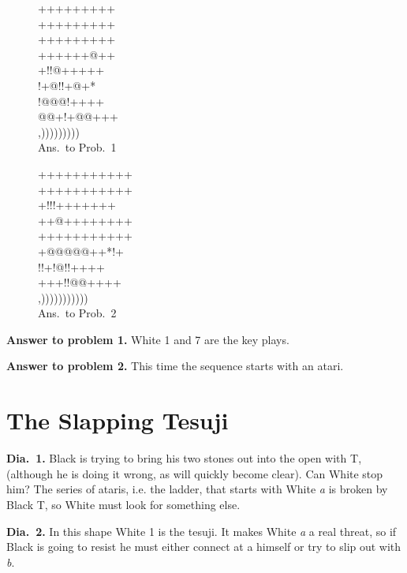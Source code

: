 \documentclass[mcrownvopaper,10pt,twopage,onecolumn,draft,showtrims]{memoir}
\begin{document}
\begin{figure}[ht]
    \begin{minipage}[c]{0.5\linewidth}
        \centering    
        {\gnos%
        +++++++++\\
        +++++++++\\
        +++++++++\\
        ++++++@++\\
        +!!@+++++\\
        !+@!!+@+*\\
        !@@@!++++\\
        @@+!+@@+++\\
        ,)))))))))\\
        }
        Ans.\ to Prob.\ 1
    \end{minipage}%
    \begin{minipage}[c]{0.5\linewidth}
        \centering    
        {\gnos%
        +++++++++++\\
        +++++++++++\\
        +!!!+++++++\\
        ++@++++++++\\
        +++++++++++\\
        +@@@@@++*!+\\
        !!+!@!!++++\\
        +++!!@@++++\\
        ,)))))))))))\\
        }
        Ans.\ to Prob.\ 2
    \end{minipage}
\end{figure}
\noindent
\textbf{Answer to problem 1.} White 1 and 7 are the key plays.

\noindent
\textbf{Answer to problem 2.} This time the sequence starts with an atari.

\section{The Slapping Tesuji}
\noindent
\textbf{Dia.\ 1.} Black is trying to bring his two stones out into the open with {\gnos T},
(although he is doing it wrong, as will quickly become clear). Can
White stop him? The series of ataris, i.e. the ladder, that starts with
White \textit{a} is broken by Black {\gnos T}, so White must look for something else.

\noindent
\textbf{Dia.\ 2.} In this shape White 1 is the tesuji. It makes White \textit{a} a real threat,
so if Black is going to resist he must either connect at a himself or try to
slip out with \textit{b}.
\end{document}
